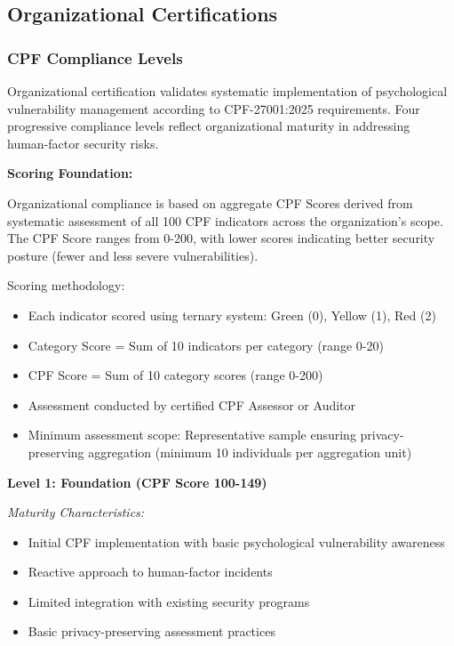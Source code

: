 \documentclass[11pt,a4paper]{article}
\begin{document}
\subsection{Organizational Certifications}

\subsubsection{CPF Compliance Levels}

Organizational certification validates systematic implementation of psychological vulnerability management according to CPF-27001:2025 requirements. Four progressive compliance levels reflect organizational maturity in addressing human-factor security risks.

\textbf{Scoring Foundation:}

Organizational compliance is based on aggregate CPF Scores derived from systematic assessment of all 100 CPF indicators across the organization's scope. The CPF Score ranges from 0-200, with lower scores indicating better security posture (fewer and less severe vulnerabilities).

Scoring methodology:
\begin{itemize}
\item Each indicator scored using ternary system: Green (0), Yellow (1), Red (2)
\item Category Score = Sum of 10 indicators per category (range 0-20)
\item CPF Score = Sum of 10 category scores (range 0-200)
\item Assessment conducted by certified CPF Assessor or Auditor
\item Minimum assessment scope: Representative sample ensuring privacy-preserving aggregation (minimum 10 individuals per aggregation unit)
\end{itemize}

\textbf{Level 1: Foundation (CPF Score 100-149)}

\textit{Maturity Characteristics:}
\begin{itemize}
\item Initial CPF implementation with basic psychological vulnerability awareness
\item Reactive approach to human-factor incidents
\item Limited integration with existing security programs
\item Basic privacy-preserving assessment practices
\end{itemize}
\end{document}
